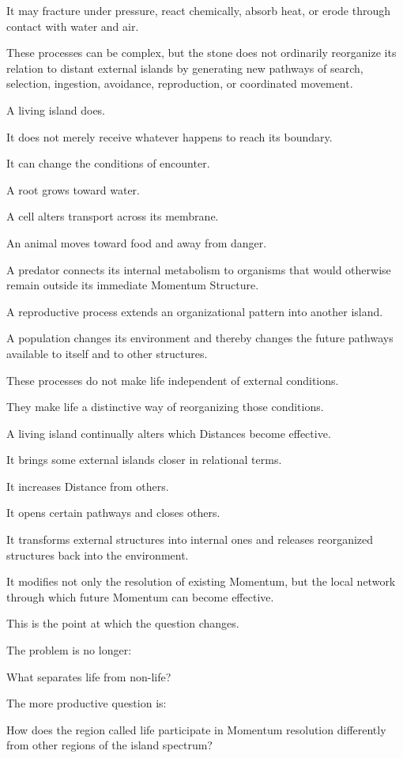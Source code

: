It may fracture under pressure, react chemically, absorb heat, or erode through contact with water and air.

These processes can be complex, but the stone does not ordinarily reorganize its relation to distant external islands by generating new pathways of search, selection, ingestion, avoidance, reproduction, or coordinated movement.

A living island does.

It does not merely receive whatever happens to reach its boundary.

It can change the conditions of encounter.

A root grows toward water.

A cell alters transport across its membrane.

An animal moves toward food and away from danger.

A predator connects its internal metabolism to organisms that would otherwise remain outside its immediate Momentum Structure.

A reproductive process extends an organizational pattern into another island.

A population changes its environment and thereby changes the future pathways available to itself and to other structures.

These processes do not make life independent of external conditions.

They make life a distinctive way of reorganizing those conditions.

A living island continually alters which Distances become effective.

It brings some external islands closer in relational terms.

It increases Distance from others.

It opens certain pathways and closes others.

It transforms external structures into internal ones and releases reorganized structures back into the environment.

It modifies not only the resolution of existing Momentum, but the local network through which future Momentum can become effective.

This is the point at which the question changes.

The problem is no longer:

What separates life from non-life?

The more productive question is:

How does the region called life participate in Momentum resolution differently from other regions of the island spectrum?

